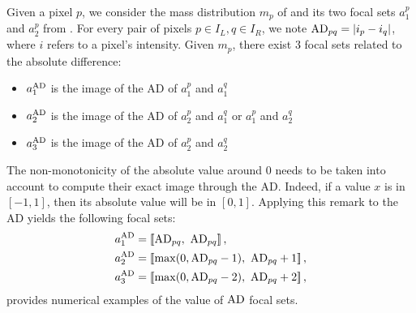 Given a pixel $p$, we consider the mass distribution $m_p$ of  and its two focal sets $a_1^p$ and $a_2^p$ from . For every pair of pixels $p\in I_L, q\in I_R$, we note $\mathrm{AD}_{pq}=|i_p - i_q|$, where $i$ refers to a pixel's intensity. Given $m_p$, there exist $3$ focal sets related to the absolute difference:
\begin{itemize}
    \item $a^{\mathrm{AD}}_1$ is the image of the AD of $a^p_1$ and $a^q_1$
    \item $a^{\mathrm{AD}}_2$ is the image of the AD of $a^p_2$ and $a^q_1$ or $a^p_1$ and $a^q_2$
    \item  $a^{\mathrm{AD}}_3$ is the image of the AD of $a^p_2$ and $a^q_2$
\end{itemize}
The non-monotonicity of the absolute value around $0$ needs to be taken into account to compute their exact image through the AD. Indeed, if a value $x$ is in $[-1,1]$, then its absolute value will be in $[0,1]$. Applying this remark to the AD yields the following focal sets:
\begin{align*}
    a^{\mathrm{AD}}_1&=[\![\mathrm{AD}_{pq},~\mathrm{AD}_{pq}]\!]\,,\\
    a^{\mathrm{AD}}_2&=[\![\max(0, \mathrm{AD}_{pq} - 1),~\mathrm{AD}_{pq} + 1]\!]\,,\\
    a^{\mathrm{AD}}_3&=[\![\max(0, \mathrm{AD}_{pq} - 2),~\mathrm{AD}_{pq} + 2]\!]\,,
\end{align*}
 provides numerical examples of the value of $\mathrm{AD}$ focal sets.
